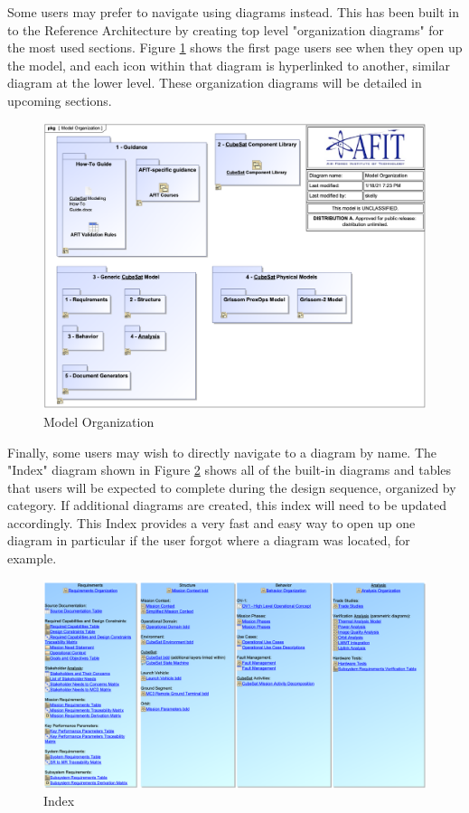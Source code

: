 Some users may prefer to navigate using diagrams instead. This has been built in to the Reference Architecture by creating top level "organization diagrams" for the most used sections. Figure \ref{fig:Model Organization} shows the first page users see when they open up the model, and each icon within that diagram is hyperlinked to another, similar diagram at the lower level. These organization diagrams will be detailed in upcoming sections.

\begin{figure}[H]
    \centering
    \includegraphics[width=\textwidth]{Thesis/Analysis_and_Results/Analysis and Results Figures/Model Organization.png}
    \caption{Model Organization}
    \label{fig:Model Organization}
\end{figure}

Finally, some users may wish to directly navigate to a diagram by name. The "Index" diagram shown in Figure \ref{fig:Index} shows all of the built-in diagrams and tables that users will be expected to complete during the design sequence, organized by category. If additional diagrams are created, this index will need to be updated accordingly. This Index provides a very fast and easy way to open up one diagram in particular if the user forgot where a diagram was located, for example. 

\begin{figure}[H]
    \centering
    \includegraphics[scale=0.5, angle=90]{Thesis/Analysis_and_Results/Analysis and Results Figures/index.png}
    \caption{Index}
    \label{fig:Index}
\end{figure}